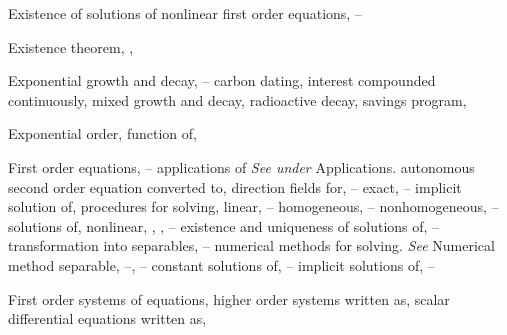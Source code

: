 \begin{theindex}
  \item Existence of solutions of nonlinear first order equations, \pageref{thmtype:2.3.1}--\pageref{exer:2.3.21}

  \item Existence theorem, \pageref{thmtype:2.1.2}, \pageref{thmtype:2.3.1}

  \item Exponential growth and decay, \pageref{eq:4.1.1}--\pageref{exer:4.1.27}
    \subitem carbon dating, \pageref{example:4.1.5}
    \subitem interest compounded continuously, \pageref{example:4.1.2}
    \subitem mixed growth and decay, \pageref{eq:4.1.10}
    \subitem radioactive decay, \pageref{eq:4.1.3}
    \subitem savings program, \pageref{example:4.1.6}

  \item Exponential order, function of, \pageref{thmtype:8.1.5} 

  \item First order equations, \pageref{eq:2.1.5}--\pageref{exer:2.6.30}
    \subitem applications of \emph{See under} Applications.
    \subitem autonomous second order equation converted to, \pageref{eq:4.4.1}
    \subitem direction fields for, \pageref{eq:1.3.1}--\pageref{figure:1.3.7}
    \subitem exact, \pageref{eq:2.5.1}--\pageref{exer:2.5.44}
      \subsubitem implicit solution of, \pageref{example:2.5.1}
      \subsubitem procedures for solving, \pageref{eq:2.5.19}
    \subitem linear, \pageref{eq:2.1.4}--\pageref{exer:2.1.49}
      \subsubitem homogeneous, \pageref{exer:3.1.6}--\pageref{eq:2.1.16}
      \subsubitem nonhomogeneous, \pageref{eq:2.1.16}--\pageref{exer:2.1.1}
      \subsubitem solutions of, \pageref{eq:2.1.2}
    \subitem nonlinear, \pageref{exer:2.1.2}, \pageref{example:2.2.6}, \pageref{thmtype:2.3.1}--\pageref{exer:2.4.58}
      \subsubitem existence and uniqueness of solutions of, \pageref{thmtype:2.3.1}--\pageref{exer:2.3.21}
      \subsubitem transformation into separables, \pageref{eq:2.4.1}--\pageref{exer:2.4.59}
    \subitem numerical methods for solving. \emph{See} Numerical method
    \subitem separable, \pageref{eq:2.2.1}--\pageref{exer:2.2.39}, \pageref{exer:2.4.1}--\pageref{exer:2.4.59}
      \subsubitem constant solutions of, \pageref{example:2.2.4}--\pageref{eq:2.2.19}
      \subsubitem implicit solutions of, \pageref{thmtype:2.2.1}--\pageref{eq:2.2.16}

  \item First order systems of equations,
    \subitem higher order systems written as, \pageref{eq:10.1.15}
    \subitem scalar differential equations written as, \pageref{example:10.1.6}


\end{theindex}
